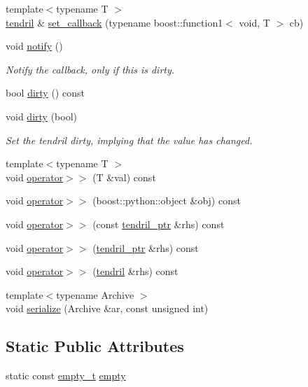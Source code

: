\begin{DoxyCompactItemize}
\item 
{\footnotesize template$<$typename T $>$ }\\\hyperlink{classecto_1_1tendril}{tendril} \& \hyperlink{classecto_1_1tendril_ab3c536756c1b4eb24c97691d23eb485a}{set\-\_\-callback} (typename boost\-::function1$<$ void, \-T $>$ cb)
\item 
void \hyperlink{classecto_1_1tendril_a87c2df829c12bcd46089d74183c1d8d8}{notify} ()
\begin{DoxyCompactList}\small\item\em \-Notify the callback, only if this is dirty. \end{DoxyCompactList}\item 
bool \hyperlink{classecto_1_1tendril_aabe2c05389023df143746b5b63b7701e}{dirty} () const 
\item 
void \hyperlink{classecto_1_1tendril_a9c2bb6262190404d3b1648cdcc2960d8}{dirty} (bool)
\begin{DoxyCompactList}\small\item\em \-Set the tendril dirty, implying that the value has changed. \end{DoxyCompactList}\item 
{\footnotesize template$<$typename T $>$ }\\void \hyperlink{classecto_1_1tendril_a0c843f467b21eee9e5bba8f3f8bc14aa}{operator$>$$>$} (\-T \&val) const 
\item 
void \hyperlink{classecto_1_1tendril_af019a42fb91908e32db96b84f4a0f978}{operator$>$$>$} (boost\-::python\-::object \&obj) const 
\item 
void \hyperlink{classecto_1_1tendril_aade5aa6d8c439ff515e312f5c9950ec9}{operator$>$$>$} (const \hyperlink{namespaceecto_a84fb5f6130275382e5cbeb5fdececa78}{tendril\-\_\-ptr} \&rhs) const 
\item 
void \hyperlink{classecto_1_1tendril_aaa5858033151487cab9e98e50c79887b}{operator$>$$>$} (\hyperlink{namespaceecto_a84fb5f6130275382e5cbeb5fdececa78}{tendril\-\_\-ptr} \&rhs) const 
\item 
void \hyperlink{classecto_1_1tendril_ad0b2e6eaec37bd46a474ed974ab4272b}{operator$>$$>$} (\hyperlink{classecto_1_1tendril}{tendril} \&rhs) const 
\item 
{\footnotesize template$<$typename Archive $>$ }\\void \hyperlink{classecto_1_1tendril_a697125cfa2b1b53ada4e5e2ee6847181}{serialize} (\-Archive \&ar, const unsigned int)
\end{DoxyCompactItemize}
\subsection*{\-Static \-Public \-Attributes}
\begin{DoxyCompactItemize}
\item 
static const \hyperlink{structecto_1_1tendril_1_1empty__t}{empty\-\_\-t} \hyperlink{classecto_1_1tendril_ab8098c05197f972a821c8b094b9a6010}{empty}
\end{DoxyCompactItemize}
